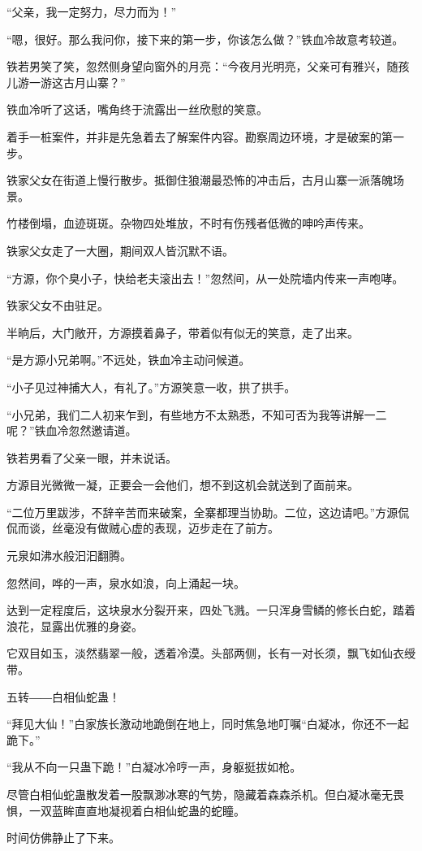 \begin{this_body}
“父亲，我一定努力，尽力而为！”

“嗯，很好。那么我问你，接下来的第一步，你该怎么做？”铁血冷故意考较道。

铁若男笑了笑，忽然侧身望向窗外的月亮：“今夜月光明亮，父亲可有雅兴，随孩儿游一游这古月山寨？”

铁血冷听了这话，嘴角终于流露出一丝欣慰的笑意。

着手一桩案件，并非是先急着去了解案件内容。勘察周边环境，才是破案的第一步。

铁家父女在街道上慢行散步。抵御住狼潮最恐怖的冲击后，古月山寨一派落魄场景。

竹楼倒塌，血迹斑斑。杂物四处堆放，不时有伤残者低微的呻吟声传来。

铁家父女走了一大圈，期间双人皆沉默不语。

“方源，你个臭小子，快给老夫滚出去！”忽然间，从一处院墙内传来一声咆哮。

铁家父女不由驻足。

半晌后，大门敞开，方源摸着鼻子，带着似有似无的笑意，走了出来。

“是方源小兄弟啊。”不远处，铁血冷主动问候道。

“小子见过神捕大人，有礼了。”方源笑意一收，拱了拱手。

“小兄弟，我们二人初来乍到，有些地方不太熟悉，不知可否为我等讲解一二呢？”铁血冷忽然邀请道。

铁若男看了父亲一眼，并未说话。

方源目光微微一凝，正要会一会他们，想不到这机会就送到了面前来。

“二位万里跋涉，不辞辛苦而来破案，全寨都理当协助。二位，这边请吧。”方源侃侃而谈，丝毫没有做贼心虚的表现，迈步走在了前方。

元泉如沸水般汩汩翻腾。

忽然间，哗的一声，泉水如浪，向上涌起一块。

达到一定程度后，这块泉水分裂开来，四处飞溅。一只浑身雪鳞的修长白蛇，踏着浪花，显露出优雅的身姿。

它双目如玉，淡然翡翠一般，透着冷漠。头部两侧，长有一对长须，飘飞如仙衣绶带。

五转――白相仙蛇蛊！

“拜见大仙！”白家族长激动地跪倒在地上，同时焦急地叮嘱“白凝冰，你还不一起跪下。”

“我从不向一只蛊下跪！”白凝冰冷哼一声，身躯挺拔如枪。

尽管白相仙蛇蛊散发着一股飘渺冰寒的气势，隐藏着森森杀机。但白凝冰毫无畏惧，一双蓝眸直直地凝视着白相仙蛇蛊的蛇瞳。

时间仿佛静止了下来。


\end{this_body}
